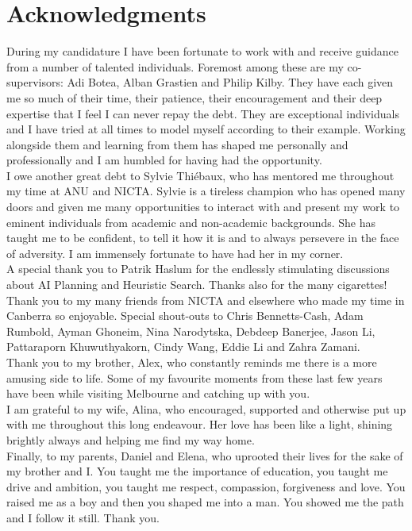 \chapter*{Acknowledgments}

During my candidature I have been fortunate to work with and receive
guidance from a number of talented individuals. 
Foremost among these are my co-supervisors: Adi Botea, 
Alban Grastien and Philip Kilby. They have each given me so much of their time, 
their patience, their encouragement and their deep expertise that 
I feel I can never repay the debt. They are exceptional individuals and
I have tried at all times to model myself according to their example.  
Working alongside them and learning from them has shaped me personally and
professionally and I am humbled for having had the opportunity.
\newline \\ 
\noindent 
I owe another great debt to Sylvie Thi{\'e}baux, who has mentored me
throughout my time at ANU and NICTA.  Sylvie is a tireless champion who has opened
many doors and given me many opportunities to interact with and present my
work to eminent individuals from academic and non-academic backgrounds. She
has taught me to be confident, to tell it how it is and to always persevere in
the face of adversity. I am immensely fortunate to have had her in my corner.
\newline \\ 
\noindent
A special thank you to Patrik Haslum for the endlessly stimulating discussions
about AI Planning and Heuristic Search.  Thanks also for the many cigarettes!
\newline \\ 
\noindent
Thank you to my many friends from NICTA and elsewhere who made my time in
Canberra so enjoyable. Special shout-outs to Chris Bennetts-Cash, Adam
Rumbold, Ayman Ghoneim, Nina Narodytska, Debdeep Banerjee, Jason Li,
Pattaraporn Khuwuthyakorn, Cindy Wang, Eddie Li and Zahra Zamani.
\newline \\ 
\noindent
Thank you to my brother, Alex, who constantly reminds me there is a more
amusing side to life. Some of my favourite moments from these last few years have
been while visiting Melbourne and catching up with you.
\newline \\ 
\noindent
I am grateful to my wife, Alina, who encouraged, supported and
otherwise put up with me throughout this long endeavour. Her love has been
like a light, shining brightly always and helping me find my way home.
\newline \\ 
\noindent
Finally, to my parents, Daniel and Elena, who uprooted their lives for the sake
of my brother and I.  You taught me the importance of education, you taught me
drive and ambition, you taught me respect, compassion, forgiveness and love.
You raised me as a boy and then you shaped me into a man. You showed me the
path and I follow it still. Thank you.

